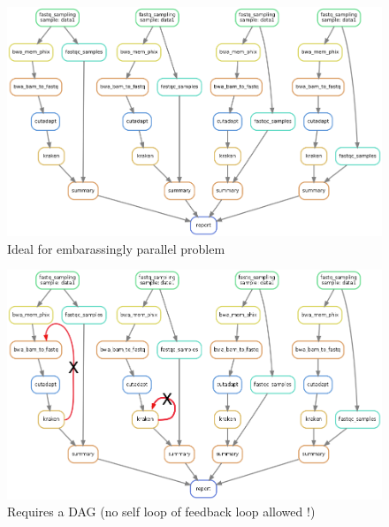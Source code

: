 \documentclass{beamer}
\begin{document}
\begin{frame}
{\begin{figure}
                \includegraphics[width=\textwidth,height=0.6\textheight]{images/dag_2.png}
                \caption[1]{Ideal for embarassingly parallel problem}
            \end{figure}                
        }
        {
            \begin{figure}
                \includegraphics[width=\textwidth,height=0.6\textheight]{images/dag_wrong2.png}
                \caption[2]{Requires a DAG (no self loop of feedback loop allowed !)}
            \end{figure}
        }
\end{frame}
\end{document}
